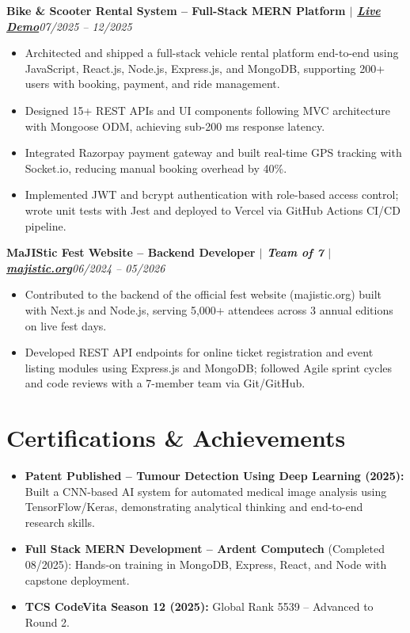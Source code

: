 \documentclass[a4paper,10pt]{article}
\newcommand{\role}[2]{%
  \noindent\textbf{#1}\hfill\textit{\small #2}\par\vspace{1pt}
}
\begin{document}
\role{Bike \& Scooter Rental System -- Full-Stack MERN Platform $\vert$ \textit{\href{https://bike-scooter-rental-system.vercel.app/}{Live Demo}}}{07/2025 -- 12/2025}
\begin{itemize}
    \item Architected and shipped a full-stack vehicle rental platform end-to-end using JavaScript, React.js, Node.js, Express.js, and MongoDB, supporting 200+ users with booking, payment, and ride management.
    \item Designed 15+ REST APIs and UI components following MVC architecture with Mongoose ODM, achieving sub-200 ms response latency.
    \item Integrated Razorpay payment gateway and built real-time GPS tracking with Socket.io, reducing manual booking overhead by 40\%.
    \item Implemented JWT and bcrypt authentication with role-based access control; wrote unit tests with Jest and deployed to Vercel via GitHub Actions CI/CD pipeline.
\end{itemize}

\role{MaJIStic Fest Website -- Backend Developer $\vert$ \textit{Team of 7} $\vert$ \textit{\href{https://majistic.org/}{majistic.org}}}{06/2024 -- 05/2026}
\begin{itemize}
    \item Contributed to the backend of the official fest website (majistic.org) built with Next.js and Node.js, serving 5,000+ attendees across 3 annual editions on live fest days.
    \item Developed REST API endpoints for online ticket registration and event listing modules using Express.js and MongoDB; followed Agile sprint cycles and code reviews with a 7-member team via Git/GitHub.
\end{itemize}

\section*{Certifications \& Achievements}
\begin{itemize}
    \item \textbf{Patent Published -- Tumour Detection Using Deep Learning (2025):} Built a CNN-based AI system for automated medical image analysis using TensorFlow/Keras, demonstrating analytical thinking and end-to-end research skills.
    \item \textbf{Full Stack MERN Development -- Ardent Computech} (Completed 08/2025): Hands-on training in MongoDB, Express, React, and Node with capstone deployment.
    \item \textbf{TCS CodeVita Season 12 (2025):} Global Rank 5539 -- Advanced to Round 2.
\end{itemize}
\end{document}
